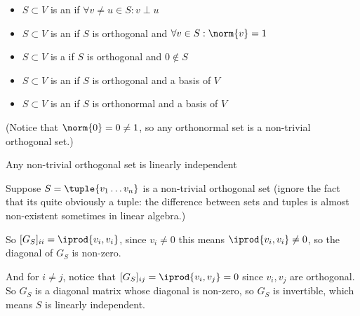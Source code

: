 \documentclass[10pt]{article}
\begin{document}
\begin{definition}

\begin{itemize}
    \item $S\subset V$ is an  if $\forall v\neq u\in S: v\perp u$
    \item $S\subset V$ is an  if $S$ is orthogonal and $\forall v\in S: \norm{v}=1$
    \item $S\subset V$ is a  if $S$ is orthogonal and $0\notin S$
    \item $S\subset V$ is an  if $S$ is orthogonal and a basis of $V$
    \item $S\subset V$ is an  if $S$ is orthonormal and a basis of $V$
\end{itemize}

(Notice that $\norm{0}=0\neq1$, so any orthonormal set is a non-trivial orthogonal set.)

\end{definition}

\begin{corollary}{Any non-trivial orthogonal set is linearly independent}

Suppose $S=\tuple{v_1\dots v_n}$ is a non-trivial orthogonal set (ignore the fact that its quite obviously a tuple: the difference between sets and tuples is almost non-existent sometimes in linear algebra.)

So $[G_S]_{ii}=\iprod{v_i,v_i}$, since $v_i\neq0$ this means $\iprod{v_i,v_i}\neq0$, so the diagonal of $G_S$ is non-zero.

And for $i\neq j$, notice that $[G_S]_{ij}=\iprod{v_i,v_j}=0$ since $v_i, v_j$ are orthogonal. So $G_S$ is a diagonal matrix whose diagonal is non-zero, so $G_S$ is invertible, which means $S$ is linearly independent.

\end{corollary}
\end{document}
